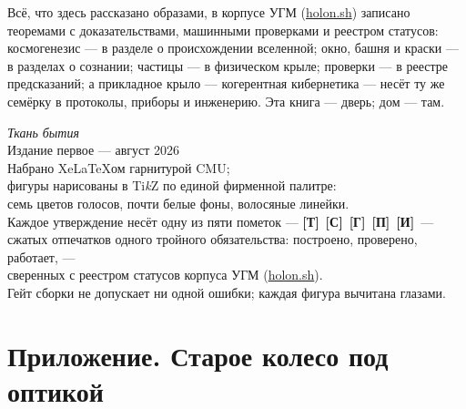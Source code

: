 \documentclass[11pt,letterpaper]{article}
\newcommand{\stT}{\textbf{[Т]}\xspace}
\newcommand{\stC}{\textbf{[С]}\xspace}
\newcommand{\stP}{\textbf{[П]}\xspace}
\newcommand{\stI}{\textbf{[И]}\xspace}
\newcommand{\stH}{\textbf{[Г]}\xspace}
\newcommand{\holonsh}{\href{https://holon.sh}{holon.sh}\xspace}
\newcommand{\voicerose}[4]{%
  \foreach \vang/\vcol in {90/cA,141.4/cS,192.8/cD,244.3/cL,295.7/cE,347.1/cO,38.6/cU}{%
    \draw[\vcol!55, thick] (#1,#2) -- ($(#1,#2)+(\vang:#3)$);
    \fill[\vcol] ($(#1,#2)+(\vang:#3)$) circle (#4);}}
\begin{document}
\vfill
\begin{factbox}
Всё, что здесь рассказано образами, в корпусе УГМ (\holonsh) записано
теоремами с доказательствами, машинными проверками и реестром
статусов: космогенезис --- в разделе о происхождении вселенной;
окно, башня и краски --- в разделах о сознании; частицы --- в
физическом крыле; проверки --- в реестре предсказаний; а прикладное
крыло --- когерентная кибернетика --- несёт ту же семёрку в
протоколы, приборы и инженерию. Эта книга --- дверь; дом --- там.
\end{factbox}

\clearpage
\thispagestyle{empty}
\vspace*{\fill}
\begin{center}\small\color{plosgray}
\begin{minipage}{0.78\textwidth}\centering
{\itshape Ткань бытия}\\[3pt]
Издание первое --- август 2026\\[12pt]
Набрано Xe\LaTeX{}ом гарнитурой CMU;\\
фигуры нарисованы в Ti\emph{k}Z по единой фирменной палитре:\\
семь цветов голосов, почти белые фоны, волосяные линейки.\\[8pt]
Каждое утверждение несёт одну из пяти пометок --- \stT\ \stC\ \stH\ \stP\ \stI\ ---\\
сжатых отпечатков одного тройного обязательства: построено, проверено, работает, ---\\
сверенных с реестром статусов корпуса УГМ (\holonsh).\\
Гейт сборки не допускает ни одной ошибки; каждая фигура вычитана глазами.\\[14pt]
\end{minipage}
\end{center}
\vspace*{\fill}


\clearpage
\section*{Приложение. Старое колесо под оптикой}
\end{document}
